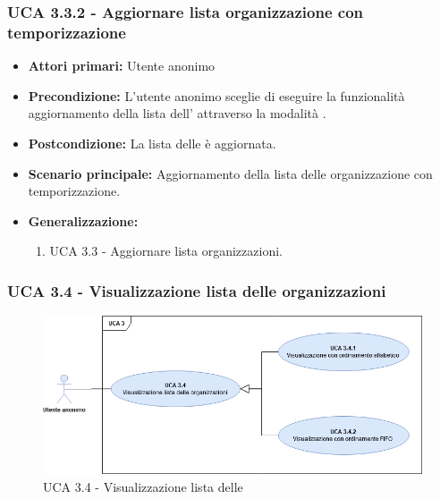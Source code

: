 \subsubsection{UCA 3.3.2 - Aggiornare lista organizzazione con temporizzazione}%
\begin{itemize} 
	\item \textbf{Attori primari:} Utente anonimo
	\item \textbf{Precondizione:} L'utente anonimo sceglie di eseguire la funzionalità aggiornamento della lista dell' attraverso la modalità .
	\item \textbf{Postcondizione:} La lista delle  è aggiornata.
	\item \textbf{Scenario principale:} Aggiornamento della lista delle organizzazione con temporizzazione.
	\item \textbf{Generalizzazione:}
	\begin{enumerate}
	\item UCA 3.3 - Aggiornare lista organizzazioni.
	\end{enumerate}	
\end{itemize}

\subsubsection{UCA 3.4 - Visualizzazione lista delle organizzazioni}%

\begin{figure}[h]
	\centering	
	\includegraphics[scale=0.45, center]{Sezioni/UseCase/Immagini/UCA3.4.png}
	\caption{UCA 3.4 - Visualizzazione lista delle }
\end{figure}

